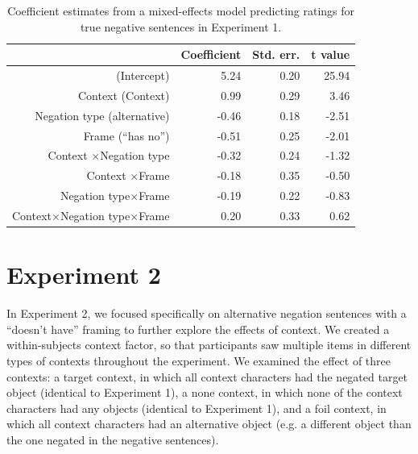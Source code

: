 \documentclass[10pt,letterpaper]{article}
\begin{document}
\begin{table}[t]
\caption{\label{tab:s1} Coefficient estimates from a mixed-effects model predicting ratings for true negative sentences in Experiment 1.}
\begin{center}
\small\addtolength{\tabcolsep}{-5pt}
\begin{tabular}{rrrr}
  \hline
 & Coefficient & Std. err. & t value \\ 
  \hline
(Intercept) & 5.24 & 0.20 & 25.94 \\ 
  Context (Context) & 0.99 & 0.29 & 3.46  \\ 
  Negation type (alternative) & -0.46 & 0.18 & -2.51 \\
  Frame (``has no'') & -0.51 & 0.25 & -2.01 \\ 
  Context $\times$Negation type & -0.32 & 0.24 & -1.32 \\
  Context $\times$Frame & -0.18 & 0.35 & -0.50 \\
  Negation type$\times$Frame & -0.19 & 0.22 & -0.83 \\
  Context$\times$Negation type$\times$Frame & 0.20 & 0.33 & 0.62 \\
   \hline
\end{tabular}
\end{center}
\end{table}

\section{Experiment 2}


In Experiment 2, we focused specifically on alternative negation sentences with a ``doesn't have'' framing to further explore the effects of context.  We created a within-subjects context factor, so that participants saw multiple items in different types of contexts throughout the experiment.  We examined the effect of three contexts: a target context, in which all context characters had the negated target object (identical to Experiment 1), a none context, in which none of the context characters had any objects (identical to Experiment 1), and a foil context, in which all context characters had an alternative object (e.g. a different object than the one negated in the negative sentences). 
\end{document}
